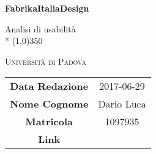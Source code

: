 \documentclass[a4paper,12pt]{article}
\author{Zanon Edoardo}
\date{aaaa/mm/gg}
\begin{document}
	\begin{titlepage}
		\centering
		\vspace{5cm}
		{\huge\bfseries FabrikaItaliaDesign\par}
		

		Analisi di usabilità \\*
		\line(1,0){350} \\
		
		\vspace{6cm}
		{\scshape\LARGE Università di Padova \par}
		\vspace{2cm}
		\begin{tabular}{c|c}
			{\hfill\textbf{Data Redazione}} 	& 2017-06-29 \\
			{\hfill\textbf{Nome Cognome}} 			& Dario Luca \\
			{\hfill\textbf{Matricola}} 			&  1097935 \\
			{\hfill\textbf{Link}} 			&  \site
		\end{tabular}
	\end{titlepage}
	

	\pagestyle{myfront}

	\newpage		
		\tableofcontents
	\newpage
		\listoffigures		%

	\label{LastFrontPage}
		\newpage
			\pagestyle{mymain}	
			
		\newpage	
			
		\newpage	
			
		\newpage	
			

	\label{LastPage}
\end{document}
